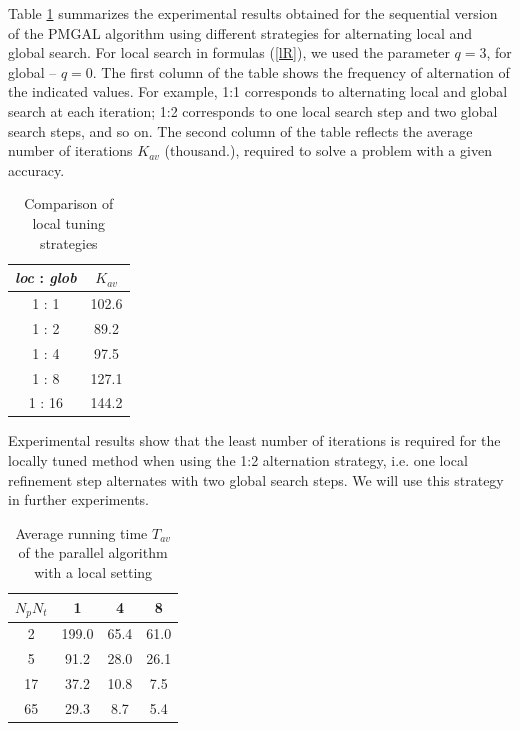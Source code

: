 \documentclass[
11pt,%
tightenlines,%
twoside,%
onecolumn,%
nofloats,%
nobibnotes,%
nofootinbib,%
superscriptaddress,%
noshowpacs,%
centertags]%
{revtex4}
\begin{document}
Table \ref{tab:2} summarizes the experimental results obtained for the sequential version of the PMGAL algorithm using different strategies for alternating local and global search. For local search in formulas  (\ref{lR}), we used the parameter $q=3$, for global -- $q=0$. The first column of the table shows the frequency of alternation of the indicated values. For example, 1:1 corresponds to alternating local and global search at each iteration; 1:2 corresponds to one local search step and two global search steps, and so on. The second column of the table reflects the average number of iterations  $K_{av}$ (thousand.), required to solve a problem with a given accuracy.

\begin{table}
	\caption{Comparison of local tuning strategies}
	\label{tab:2}
	\center
	\begin{tabular}{|c|c|}
		\hline		
		\textit{loc} : \textit{glob} & $K_{av}$   \\
		\hline 
		1 : 1 & 102.6\\
		1 : 2 & 89.2\\
		1 : 4 & 97.5\\
		1 : 8 & 127.1\\
		1 : 16 & 144.2\\
		\hline
	\end{tabular}
\end{table}	


Experimental results show that the least number of iterations is required for the locally tuned method when using the 1:2 alternation strategy, i.e. one local refinement step alternates with two global search steps. We will use this strategy in further experiments.

\begin{table}
	\caption{Average running time $T_{av}$ of the parallel algorithm with a local setting}
	\label{tab:3}
	\center
	\begin{tabular}{|c|c|c|c|}
		\hline	
	\diaghead{\theadfont Diag Column} { $N_{p}$}{$N_{t}$} & 1 & 4 & 8\\
	
		\hline		
		2  & 199.0 & 65.4 & 61.0  \\
		5  & 91.2 & 28.0 &  26.1 \\
		17  & 37.2 & 10.8 & 7.5 \\
		65  & 29.3 & 8.7 & 5.4 \\
		\hline
	\end{tabular}
\end{table}	
\end{document}
